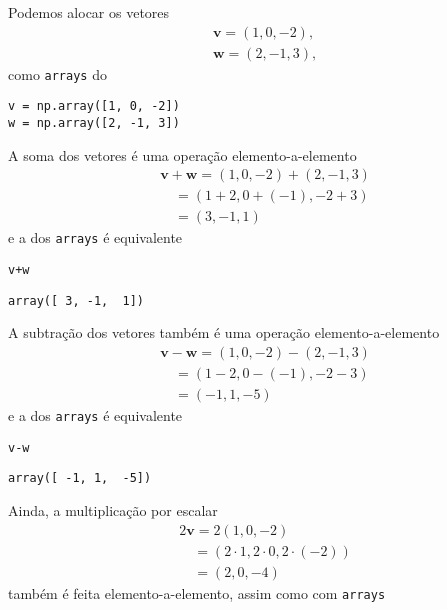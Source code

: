 \begin{ex}
  Podemos alocar os vetores
  \begin{align}
    & \pmb{v} = (1, 0, -2), \\
    & \pmb{w} = (2, -1, 3),
  \end{align}
  como \texttt{arrays} do {\numpy}

\begin{lstlisting}
v = np.array([1, 0, -2])
w = np.array([2, -1, 3])
\end{lstlisting}

  A soma dos vetores é uma operação elemento-a-elemento
  \begin{align}
    & \pmb{v}+\pmb{w} = (1, 0, -2) + (2, -1, 3) \\
    & \text{}\quad = \left(1+2, 0+(-1), -2+3\right) \\
    & \text{}\quad = (3, -1, 1)
  \end{align}
e a dos \texttt{arrays} é equivalente

\begin{lstlisting}
v+w
\end{lstlisting}

\begin{verbatim}
array([ 3, -1,  1])
\end{verbatim}

  A subtração dos vetores também é uma operação elemento-a-elemento
  \begin{align}
    & \pmb{v}-\pmb{w} = (1, 0, -2) - (2, -1, 3) \\
    & \text{}\quad = \left(1-2, 0-(-1), -2-3\right) \\
    & \text{}\quad = (-1, 1, -5)
  \end{align}
  e a dos \texttt{arrays} é equivalente

\begin{lstlisting}
v-w
\end{lstlisting}

\begin{verbatim}
array([ -1, 1,  -5])
\end{verbatim}

  Ainda, a multiplicação por escalar
  \begin{align}
    & 2\pmb{v} = 2(1, 0, -2) \\
    & \text{}\quad = \left(2\cdot 1, 2\cdot 0, 2\cdot(-2)\right) \\
    & \text{}\quad = (2, 0, -4)
  \end{align}
  também é feita elemento-a-elemento, assim como com \texttt{arrays}


\end{ex}
